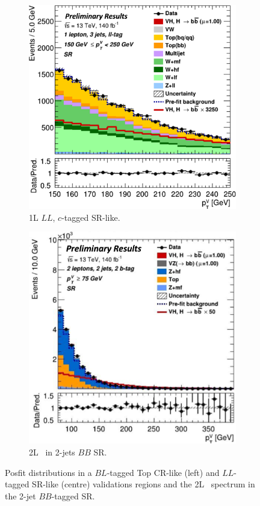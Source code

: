 \begin{figure}[h!]
\begin{subfigure}[b]{0.32\textwidth}
        \includegraphics[width=\textwidth]{Images/VH/Fit/fromSlides/Postfit/1L_LLSR.png}
        \caption{1L $LL$, $c$-tagged SR-like.}
        \label{fig:val_LLSR}
    \end{subfigure}
    \begin{subfigure}[b]{0.32\textwidth}
      \centering
      \includegraphics[width=\textwidth]{Images/VH/Fit/fromSlides/Postfit/2LBB.png}
      \caption{2L \ptv\ in 2-jets $BB$ SR.}
      \label{fig:fit_ptv2L}
    \end{subfigure} 
    \caption{Posfit distributions in a $BL$-tagged Top CR-like (left) and $LL$-tagged SR-like (centre) validations regions and the 2L \ptv\ spectrum in the 2-jet $BB$-tagged SR.}
    \label{fig:postfitval}
\end{figure} 

